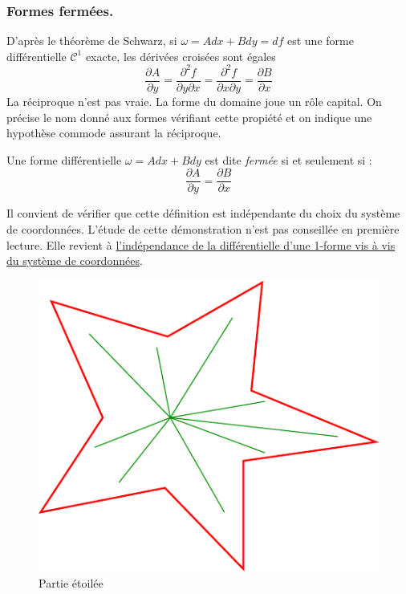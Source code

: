 \subsubsection{Formes fermées.}
D'après le théorème de Schwarz, si $\omega=Adx+Bdy = df$ est une forme différentielle $\mathcal C^1$ exacte, les dérivées croisées sont égales 
\begin{displaymath}
\frac{\partial A}{\partial y}=\frac{\partial^2 f}{\partial y\partial x}=\frac{\partial^2 f}{\partial x\partial y}=\frac{\partial B}{\partial x} 
\end{displaymath}
La réciproque n'est pas vraie. La forme du domaine joue un rôle capital. On précise le nom donné aux formes vérifiant cette propiété et on indique une hypothèse commode assurant la réciproque.
\begin{defi}
 Une forme différentielle $\omega= Adx +Bdy$ est dite \emph{fermée} si et seulement si :
\begin{displaymath}
 \frac{\partial A}{\partial y} = \frac{\partial B}{\partial x}  
\end{displaymath}
\end{defi}
\begin{demo}
 Il convient de vérifier que cette définition est indépendante du choix du système de coordonnées. L'étude de cette démonstration n'est pas conseillée en première lecture. Elle revient à \href{\baseurl C6308.pdf}{l'indépendance de la différentielle d'une 1-forme vis à vis du système de coordonnées}.
\end{demo}
\begin{figure}
 \centering
\includegraphics{C2269_8.pdf}
\caption{Partie étoilée}
\label{fig:C2269_8}
\end{figure}


